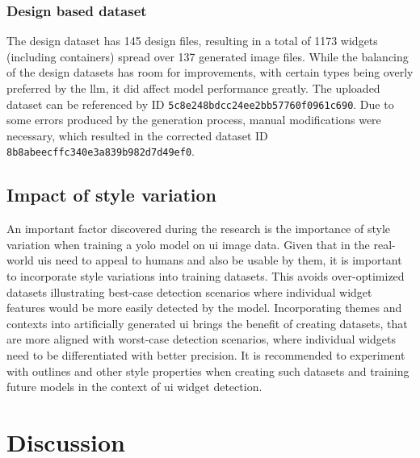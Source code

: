 \documentclass[Bachelor, BIC, english, fhCitStyle, IEEE]{BASE/twbook} %
\def\code#1{\texttt{#1}}
\begin{document}
\subsection{Design based dataset}
The design dataset has 145 design files, resulting in a total of 1173 widgets (including containers) spread over 137 generated image files. While the balancing of the design datasets has room for improvements, with certain types being overly preferred by the \ac{llm}, it did affect model performance greatly. The uploaded dataset can be referenced by ID \code{5c8e248bdcc24ee2bb57760f0961c690}. Due to some errors produced by the generation process, manual modifications were necessary, which resulted in the corrected dataset ID \code{8b8abeecffc340e3a839b982d7d49ef0}.
\section{Impact of style variation}
An important factor discovered during the research is the importance of style variation when training a \ac{yolo} model on \ac{ui} image data. Given that in the real-world \acp{ui} need to appeal to humans and also be usable by them, it is important to incorporate style variations into training datasets. This avoids over-optimized datasets illustrating best-case detection scenarios where individual widget features would be more easily detected by the model. Incorporating themes and contexts into artificially generated \ac{ui} brings the benefit of creating datasets, that are more aligned with worst-case detection scenarios, where individual widgets need to be differentiated with better precision. It is recommended to experiment with outlines and other style properties when creating such datasets and training future models in the context of \ac{ui} widget detection.
\clearpage
\chapter{Discussion}
\clearpage %

\printbib %
\clearpage

\listoffigures %
\clearpage
\end{document}
